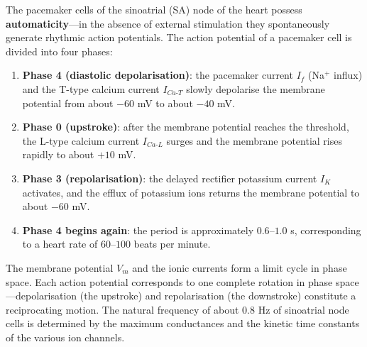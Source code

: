 \begin{definition}\label{def:cardiac_pacemaker}
The pacemaker cells of the sinoatrial (SA) node of the heart possess \textbf{automaticity}---in the absence of external stimulation they spontaneously generate rhythmic action potentials. The action potential of a pacemaker cell is divided into four phases:
\begin{enumerate}[label=(\roman*)]
    \item \textbf{Phase 4 (diastolic depolarisation)}: the pacemaker current $I_f$ (Na$^+$ influx) and the T-type calcium current $I_{Ca\text{-}T}$ slowly depolarise the membrane potential from about $-60$ mV to about $-40$ mV.
    \item \textbf{Phase 0 (upstroke)}: after the membrane potential reaches the threshold, the L-type calcium current $I_{Ca\text{-}L}$ surges and the membrane potential rises rapidly to about $+10$ mV.
    \item \textbf{Phase 3 (repolarisation)}: the delayed rectifier potassium current $I_K$ activates, and the efflux of potassium ions returns the membrane potential to about $-60$ mV.
    \item \textbf{Phase 4 begins again}: the period is approximately $0.6$--$1.0$ s, corresponding to a heart rate of $60$--$100$ beats per minute.
\end{enumerate}
The membrane potential $V_m$ and the ionic currents form a limit cycle in phase space. Each action potential corresponds to one complete rotation in phase space---depolarisation (the upstroke) and repolarisation (the downstroke) constitute a reciprocating motion. The natural frequency of about $0.8$ Hz of sinoatrial node cells is determined by the maximum conductances and the kinetic time constants of the various ion channels.
\end{definition}

